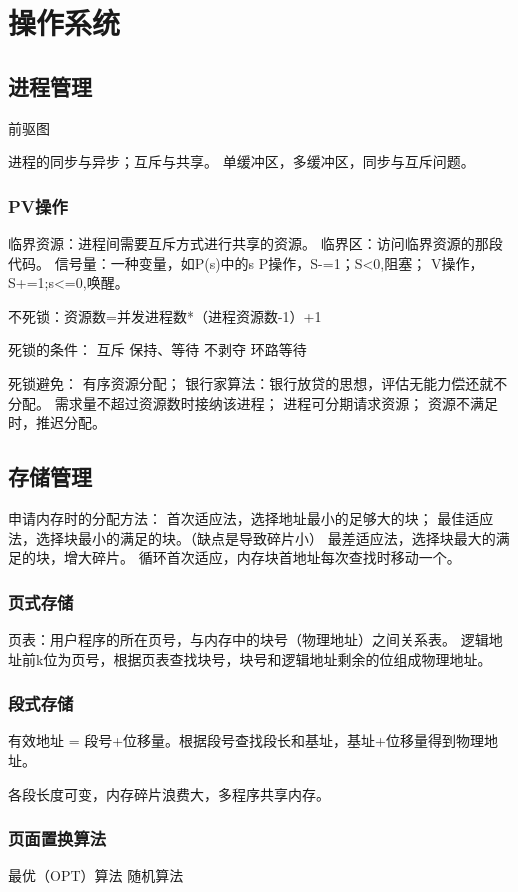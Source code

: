 \documentclass[UTF8]{article}
\begin{document}
\section{操作系统}

\subsection{进程管理}
前驱图

进程的同步与异步；互斥与共享。
单缓冲区，多缓冲区，同步与互斥问题。

\subsubsection{PV操作}
临界资源：进程间需要互斥方式进行共享的资源。
临界区：访问临界资源的那段代码。
信号量：一种变量，如P(s)中的s
P操作，S-=1；S<0,阻塞；
V操作，S+=1;s<=0,唤醒。


不死锁：资源数=并发进程数*（进程资源数-1）+1

死锁的条件：
互斥
保持、等待
不剥夺
环路等待

死锁避免：
有序资源分配；
银行家算法：银行放贷的思想，评估无能力偿还就不分配。
需求量不超过资源数时接纳该进程；
进程可分期请求资源；
资源不满足时，推迟分配。


\subsection{存储管理}
申请内存时的分配方法：
首次适应法，选择地址最小的足够大的块；
最佳适应法，选择块最小的满足的块。（缺点是导致碎片小）
最差适应法，选择块最大的满足的块，增大碎片。
循环首次适应，内存块首地址每次查找时移动一个。


\subsubsection{页式存储}

页表：用户程序的所在页号，与内存中的块号（物理地址）之间关系表。
逻辑地址前k位为页号，根据页表查找块号，块号和逻辑地址剩余的位组成物理地址。


\subsubsection{段式存储}
有效地址 = 段号+位移量。根据段号查找段长和基址，基址+位移量得到物理地址。

各段长度可变，内存碎片浪费大，多程序共享内存。

\subsubsection{页面置换算法}
最优（OPT）算法
随机算法
\end{document}
